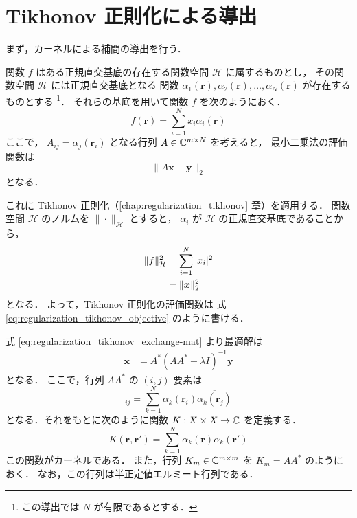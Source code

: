 %

\section{Tikhonov 正則化による導出}\label{sec:interp_kernel_tikhonov}

まず，カーネルによる補間の導出を行う．

関数 $f$ はある正規直交基底の存在する関数空間 $\mathcal{H}$ に属するものとし，
その関数空間 $\mathcal{H}$ には正規直交基底となる
関数 $\alpha_1(\bm{r}), \alpha_2(\bm{r}), \ldots, \alpha_N(\bm{r})$ が存在するものとする
\footnote{この導出では $N$ が有限であるとする．}．
それらの基底を用いて関数 $f$ を次のようにおく．
\begin{equation}
    f(\bm{r}) = \sum_{i = 1}^{N} x_i \alpha_i(\bm{r})
\end{equation}
ここで，
$A_{ij} = \alpha_j(\bm{r}_i)$ となる行列 $A \in \mathbb{C}^{m \times N}$ を考えると，
最小二乗法の評価関数は
\begin{equation}
    \|A \bm{x} - \bm{y}\|_2
\end{equation}
となる．

これに Tikhonov 正則化（\ref{chap:regularization_tikhonov} 章）を適用する．
関数空間 $\mathcal{H}$ のノルムを $\|\cdot\|_{\mathcal{H}}$ とすると，
$\alpha_i$ が $\mathcal{H}$ の正規直交基底であることから，
\begin{align}
    \|f\|_{\mathcal{H}}^2
     & = \sum_{i = 1}^{N} |x_i|^2 \notag \\
     & = \|\bm{x}\|_2^2
\end{align}
となる．
よって，Tikhonov 正則化の評価関数は
式 \eqref{eq:regularization_tikhonov_objective} のように書ける．

式 \eqref{eq:regularization_tikhonov_exchange-mat} より最適解は
\begin{align}
    \bm{x} & = A^* (AA^* + \lambda I)^{-1} \bm{y}
\end{align}
となる．
ここで，行列 $AA^*$ の $(i, j)$ 要素は
\begin{equation}
    [AA^*]_{ij} = \sum_{k = 1}^{N} \alpha_k(\bm{r}_i) \overline{\alpha_k(\bm{r}_j)}
\end{equation}
となる．それをもとに次のように関数 $K : X \times X \to \mathbb{C}$ を定義する．
\begin{equation}
    K(\bm{r}, \bm{r}') = \sum_{k = 1}^{N} \alpha_k(\bm{r}) \overline{\alpha_k(\bm{r}')}
\end{equation}
この関数がカーネルである．
また，行列 $K_m \in \mathbb{C}^{m \times m}$ を
$K_m = AA^*$ のようにおく．
なお，この行列は半正定値エルミート行列である．

